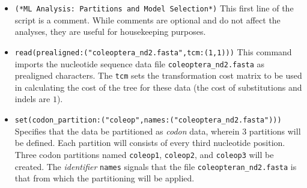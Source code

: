 \begin{itemize}
\item \texttt{(*ML Analysis: Partitions and Model Selection*)} This first line 
of the script is a comment. While comments are optional and do not affect the 
analyses, they are useful for housekeeping purposes. 
\item \texttt{read(prealigned:("coleoptera\_nd2.fasta",tcm:(1,1)))} This command 
imports the nucleotide sequence data file \texttt{coleoptera\_nd2.fasta} as 
prealigned characters.  The \texttt{tcm} sets the transformation cost matrix 
to be used in calculating the cost of the tree for these data (the cost of substitutions 
and indels are $1$). 
\item \texttt{set(codon\_partition:("coleop",names:("coleoptera\_nd2.fasta")))} 
Specifies that the data be partitioned as \emph{codon} data, wherein $3$ partitions will
be defined.  Each partition will consists of every third nucleotide position.
Three codon partitions named \texttt{coleop1}, \texttt{coleop2}, and
\texttt{coleop3} will be created. The \emph{identifier} \texttt{names} 
signals that the file \texttt{coleopteran\_nd2.fasta}
is that from which the partitioning will be applied.



\end{itemize}
